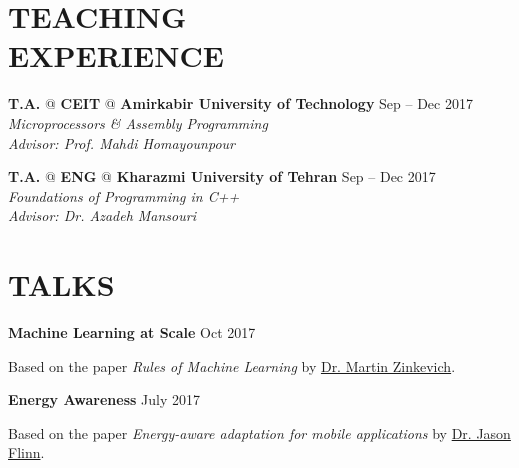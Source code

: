 \documentclass[margin, 10pt]{res} %
\begin{document}
\begin{resume}
  	\vspace{0.5cm}
    
    \section{TEACHING \\ EXPERIENCE} 
    
   \textbf{T.A.} \textsc{@}
   \textbf{CEIT} \textsc{@} \textbf{Amirkabir University of Technology}
   \hfill {Sep -- Dec 2017}\\
   \textit{Microprocessors \& Assembly Programming}\\
   \textit{Advisor: Prof. Mahdi Homayounpour}
   
   \textbf{T.A.} \textsc{@}
   \textbf{ENG} \textsc{@} \textbf{Kharazmi University of Tehran}
   \hfill {Sep -- Dec 2017}\\
   \textit{Foundations of Programming in C++}\\
   \textit{Advisor: Dr. Azadeh Mansouri}
      	\vspace{0.5cm}
\newpage
	\section{TALKS} 
	\textbf{Machine Learning at Scale}
	\hfill {Oct 2017}
		\vspace{0.15cm}
	\begin{innerlist}
		\item Based on the paper \textit{Rules of Machine Learning} by \href{http://martin.zinkevich.org/rules_of_ml/rules_of_ml.pdf}{Dr. Martin Zinkevich}.
	\end{innerlist}

	\textbf{Energy Awareness}
	\hfill {July 2017}
		\vspace{0.15cm}
	\begin{innerlist}
		\item Based on the paper \textit{Energy-aware adaptation for mobile applications} by \href{http://www-cgi.cs.cmu.edu/afs/cs.cmu.edu/Web/People/odyssey/docdir/s17.pdf5}{Dr. Jason Flinn}.
	\end{innerlist}


\end{resume}
\end{document}
